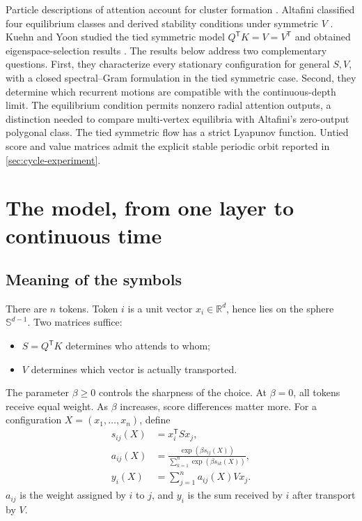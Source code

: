 \documentclass[11pt,a4paper]{article}
\theoremstyle{definition}
\newcommand{\sphere}{\mathbb S}
\newcommand{\R}{\mathbb R}
\newcommand{\T}{\mathsf T}
\begin{document}
Particle descriptions of attention account for cluster formation
\cite{geshkovski2023clusters,geshkovski2025perspective}. Altafini classified four
equilibrium classes and derived stability conditions under symmetric $V$
\cite{altafini2025multistability}. Kuehn and Yoon studied the tied symmetric model
$Q^{\T}K=V=V^{\T}$ and obtained eigenspace-selection results
\cite{kuehnyoon2026spectral}. The results below address two complementary questions.
First, they characterize every stationary configuration for general $S,V$, with a
closed spectral--Gram formulation in the tied symmetric case. Second, they determine
which recurrent motions are compatible with the continuous-depth limit. The
equilibrium condition permits nonzero radial attention outputs, a distinction needed
to compare multi-vertex equilibria with Altafini's zero-output polygonal class. The
tied symmetric flow has a strict Lyapunov function. Untied score and value matrices
admit the explicit stable periodic orbit reported in \cref{sec:cycle-experiment}.

\section{The model, from one layer to continuous time}
\label{sec:model}

\subsection{Meaning of the symbols}

There are $n$ tokens. Token $i$ is a unit vector $x_i\in\R^d$, hence lies on the sphere
$\sphere^{d-1}$. Two matrices suffice:
\begin{itemize}
  \item $S=Q^{\T}K$ determines who attends to whom;
  \item $V$ determines which vector is actually transported.
\end{itemize}

The parameter $\beta\geq0$ controls the sharpness of the choice. At $\beta=0$, all
tokens receive equal weight. As $\beta$ increases, score differences matter more. For
a configuration $X=(x_1,\ldots,x_n)$, define
\begin{align}
 s_{ij}(X)&=x_i^{\T}Sx_j,\\
 a_{ij}(X)&=\frac{\exp(\beta s_{ij}(X))}
 {\sum_{k=1}^n\exp(\beta s_{ik}(X))},\\
 y_i(X)&=\sum_{j=1}^n a_{ij}(X)Vx_j. \label{eq:attention-output}
\end{align}
$a_{ij}$ is the weight assigned by $i$ to $j$, and $y_i$ is the sum received by $i$
after transport by $V$.
\end{document}
